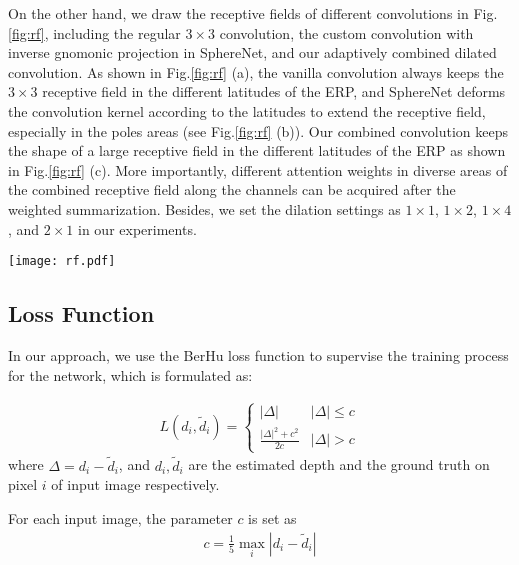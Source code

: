 \documentclass[letterpaper]{article} \usepackage{aaai21}  \usepackage{times}  \usepackage{helvet} \usepackage{courier}  \usepackage[hyphens]{url}  \usepackage{graphicx} \urlstyle{rm} \def\UrlFont{\rm}  \usepackage{natbib}  \usepackage{caption} \frenchspacing  \setlength{\pdfpagewidth}{8.5in}  \setlength{\pdfpageheight}{11in}
\begin{document}
On the other hand, we draw the receptive fields of different convolutions in Fig.\ref{fig:rf}, including the regular $3\times3$ convolution, the custom convolution with inverse gnomonic projection in SphereNet, and our adaptively combined dilated convolution. As shown in Fig.\ref{fig:rf} (a), the vanilla convolution always keeps the $3\times3$ receptive field in the different latitudes of the ERP, and SphereNet deforms the convolution kernel according to the latitudes to extend the receptive field, especially in the poles areas (see Fig.\ref{fig:rf} (b)). Our combined convolution keeps the shape of a large receptive field in the different latitudes of the ERP as shown in Fig.\ref{fig:rf} (c). More importantly, different attention weights in diverse areas of the combined receptive field along the channels can be acquired after the weighted summarization. Besides, we set the dilation settings as $1\times1$, $1\times2$, $1\times4$, and $2\times1$ in our experiments.

\begin{figure*}[tb]
\centering
  \texttt{[image: rf.pdf]}
  \caption{Receptive fields (RF) of different convolutions. In sub-figure (c), the items with the same color in a sub-area of a receptive field have the same interest scores.}
  \label{fig:rf}
\end{figure*}

\subsection{Loss Function}
In our approach, we use the BerHu \cite{DBLP:conf/3dim/LainaRBTN16} loss function to supervise the training process for the network, which is formulated as:

\begin{align}
L(d_i,\widetilde{d}_i) = \left\{
    \begin{matrix}
    |\Delta| & |\Delta|\le c \\
    \frac{|\Delta|^2+c^2}{2c} & |\Delta|> c
    \end{matrix}
\right.
\end{align}
where $\Delta=d_i-\widetilde{d}_i$, and $d_i,\widetilde{d}_i$ are the estimated depth and the ground truth on pixel $i$ of input image respectively. 

For each input image, the parameter $c$ is set as
\begin{align}
    c=\frac{1}{5}\max_i |d_i-\widetilde{d}_i|
\end{align}
\end{document}
